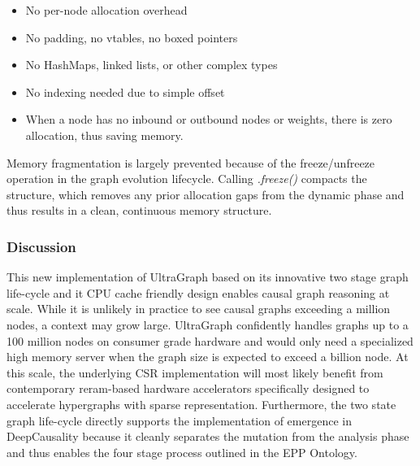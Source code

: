 \begin{itemize}
	\item No per-node allocation overhead
	\item No padding, no vtables, no boxed pointers
	\item No HashMaps, linked lists, or other complex types
	\item No indexing needed due to simple offset\
	\item When a node has no inbound or outbound nodes or weights, there is zero allocation, thus saving memory.
\end{itemize}


Memory fragmentation is largely prevented because of the freeze/unfreeze operation in the graph evolution lifecycle. Calling \textit{.freeze()} compacts the structure, which removes any prior allocation gaps from the dynamic phase and thus results in a clean, continuous memory structure.

\subsubsection{Discussion}

This new implementation of UltraGraph based on its innovative two stage graph life-cycle and it CPU cache friendly design enables causal graph reasoning at scale. While it is unlikely in practice to see causal graphs exceeding a million nodes, a context may grow large. UltraGraph confidently handles graphs up to a 100 million nodes on consumer grade hardware and would only need a specialized high memory server when the graph size is expected to exceed a billion node. At this scale, the underlying CSR implementation will most likely benefit from contemporary reram-based\cite{zheng2023phgraph} hardware accelerators specifically designed to accelerate hypergraphs with sparse representation. 
Furthermore, the two state graph life-cycle directly supports the implementation of emergence in DeepCausality because it cleanly separates the mutation from the analysis phase and thus enables the four stage process outlined in the EPP Ontology.  

\newpage